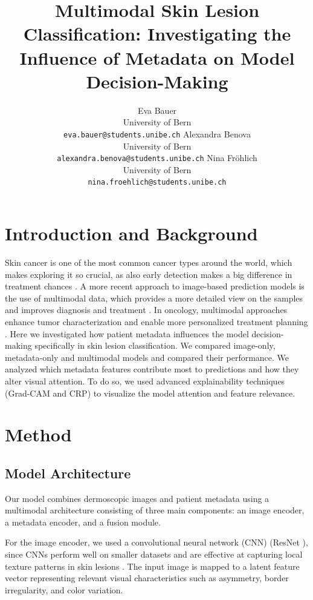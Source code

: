 \documentclass{article}
\title{Multimodal Skin Lesion Classification: Investigating the Influence of Metadata on Model Decision-Making}
\author{
  Eva Bauer \\
  University of Bern \\
  \texttt{eva.bauer@students.unibe.ch}
  \And
   Alexandra Benova \\
  University of Bern \\
  \texttt{alexandra.benova@students.unibe.ch}
   \And
   Nina Fröhlich \\
  University of Bern \\
  \texttt{nina.froehlich@students.unibe.ch}
}
\begin{document}
\maketitle


\vspace{0.5em}


\section{Introduction and Background}

Skin cancer is one of the most common cancer types around the world, which makes exploring it so crucial,
as also early detection makes a big difference in treatment chances \cite{watson2026}.
A more recent approach to image-based prediction models is the use of multimodal data, which provides a more detailed
view on the samples and improves diagnosis and treatment \cite{hao2025}. In oncology, multimodal approaches enhance tumor
characterization and enable more personalized treatment planning \cite{hao2025}. 
Here we investigated how patient metadata influences the model decision-making specifically in skin lesion
classification. We compared image-only, metadata-only and multimodal models and compared their performance.
We analyzed which metadata features contribute most to predictions and how they alter visual attention.
To do so, we used advanced explainability techniques (Grad-CAM and CRP) to visualize the model attention and
feature relevance.


\section{Method}
\subsection{Model Architecture}

Our model combines dermoscopic images and patient metadata using a multimodal architecture consisting of three main components: an image encoder, a metadata encoder, and a fusion module.

For the image encoder, we used a convolutional neural network (CNN) (ResNet \cite{he2016resnet}), since CNNs perform well on smaller datasets and are effective at capturing local texture patterns in skin lesions \cite{esteva2017dermatologist}. The input image is mapped to a latent feature vector representing relevant visual characteristics such as asymmetry, border irregularity, and color variation.
\end{document}
